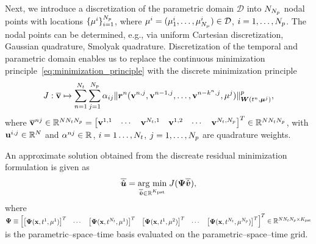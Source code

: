 \documentclass[3p,computermodern,10pt]{elsarticle}
\begin{document}
Next, we introduce a discretization of the parametric domain $\mathcal{D}$ into $N_{N_p}$ nodal points with locations $\{ \mathbf{\mu}^i \}_{i = 1}^{N_p}$, where $\mathbf{\mu}^i = (\mathbf{\mu}^i_1 , \ldots,\mathbf{\mu}^i_{N_{\mu}}) \in \mathcal{D}$, $i=1,\ldots,N_p$. The nodal points can be determined, e.g., via uniform Cartesian discretization, Gaussian quadrature, Smolyak quadrature. Discretization of the temporal and parametric domain enables us to replace the continuous minimization principle~\eqref{eq:minimization_principle} with the discrete minimization principle
 \begin{equation}\label{eq:discrete_minimization_principle}
J : \overline{\mathbf{v}}  \mapsto \sum_{n=1}^{N_t}  \sum_{j=1}^{N_p} \alpha_{ij} \| \boldsymbol{r}^n (\mathbf{v}^{n,j},\mathbf{v}^{n-1,j},\ldots,\mathbf{v}^{n-k^n,j},\mathbf{\mu}^j) \|_{\boldsymbol W(t^n,\boldsymbol \mu^j)}^p,
\end{equation}
where $\overline{\mathbf{v}}^{nj} \in \mathbb{R}^{N N_t N_p} =  \begin{bmatrix} \mathbf{v}^{1,1} & \cdots & \mathbf{v}^{N_t,1} & \mathbf{v}^{1,2} & \cdots & \mathbf{v}^{N_t,N_p} \end{bmatrix}^T \in \mathbb{R}^{N N_t N_p}$, with $\mathbf{u}^{i,j} \in \mathbb{R}^{N}$ and $\alpha^{nj} \in \mathbb{R}^{}$, $i=1\dots,N_t$, $j=1,\ldots,N_p$ are quadrature weights. 

An approximate solution obtained from the discreate residual minimization formulation is given as
\begin{equation}\label{eq:discrete_minimization_principle_solution}
\overline{\hat{\boldsymbol u}} = \underset{\overline{\hat{\boldsymbol v}} \in \mathbb{R}^{K_{\text{pst}}} }{\text{arg min} } \; J( \mathbf{ \Psi} \overline{\hat{\boldsymbol v}}),
\end{equation}
where $\mathbf{ \Psi} \equiv \begin{bmatrix} \left[ \boldsymbol \Psi(\mathbf{x},t^1,\mathbf{\mu}^1)\right]^T & \cdots & \left[\boldsymbol \Psi(\mathbf{x},t^{N_t},\mathbf{\mu}^1) \right]^T & \left[ \boldsymbol \Psi(\mathbf{x},t^1,\mathbf{\mu}^2) \right]^T & \cdots & \left[\boldsymbol \Psi(\mathbf{x},t^{N_t},\mathbf{\mu}^{N_p}) \right]^T \end{bmatrix}^T \in \mathbb{R}^{N N_t N_p \times K_{\text{pst}}}$ is the parametric--space--time basis evaluated on the parametric--space--time grid.
\end{document}
